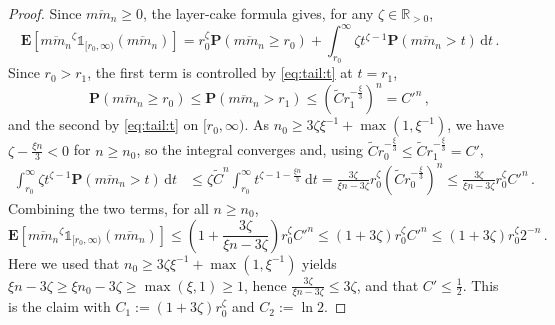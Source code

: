\documentclass{article}
\newcommand{\R}{\mathbb{R}}
\newcommand{\Rpp}{\R_{>0}}
\newcommand{\lab}{\left[} %
\newcommand{\rab}{\right]} %
\newcommand{\ab}[1]{\lab #1 \rab} %
\newcommand{\abOf}[1]{\!\ab{#1}} %
\newcommand{\lb}{\left(} %
\newcommand{\rb}{\right)} %
\newcommand{\br}[1]{\lb #1 \rb} %
\newcommand{\brOf}[1]{\!\br{#1}} %
\renewcommand{\Pr}{\mathbf{P}} %
\newcommand{\PrOf}[1]{\Pr\brOf{#1}}
\newcommand{\E}{\mathbf{E}} %
\newcommand{\EOf}[1]{\E\abOf{#1}}
\newcommand{\ind}{\mathds{1}}%
\newcommand{\indOfOf}[2]{\ind_{\!#1}\!\brOf{#2}}%
\newcommand{\eqcm}{\,,} %
\newcommand{\eqfs}{\,.}
\newcommand{\dl}{\mathrm{d}} %
\newcommand{\ol}[2]{\overline{#1#2}}
\begin{document}
\begin{proof}
    Since $\ol m{m_n} \geq 0$, the layer-cake formula gives, for any $\zeta \in \Rpp$,
    \begin{equation}
        \EOf{\ol m{m_n}^\zeta \indOfOf{[r_0,\infty)}{\ol m{m_n}}}
        =
        r_0^\zeta \PrOf{\ol m{m_n} \geq r_0}
        +
        \int_{r_0}^\infty \zeta t^{\zeta-1} \PrOf{\ol m{m_n} > t}\,\dl t
        \eqfs
    \end{equation}
    Since $r_0 > r_1$, the first term is controlled by \eqref{eq:tail:t} at $t = r_1$,
    \begin{equation}
        \PrOf{\ol m{m_n} \geq r_0}
        \leq
        \PrOf{\ol m{m_n} > r_1}
        \leq
        \br{\tilde C r_1^{-\frac\xi3}}^n
        =
        {C'}^n
        \eqcm
    \end{equation}
    and the second by \eqref{eq:tail:t} on $[r_0,\infty)$. As
    $n_0 \geq 3\zeta\xi^{-1} + \max(1,\xi^{-1})$, we have $\zeta - \frac{\xi n}3 < 0$
    for $n \geq n_0$, so the integral converges and, using
    $\tilde C r_0^{-\frac\xi3} \leq \tilde C r_1^{-\frac\xi3} = C'$,
    \begin{align}
        \int_{r_0}^\infty \zeta t^{\zeta-1} \PrOf{\ol m{m_n} > t}\,\dl t
        &\leq
        \zeta \tilde C^n \int_{r_0}^\infty t^{\zeta-1-\frac{\xi n}3}\,\dl t
        =
        \frac{3\zeta}{\xi n - 3\zeta} r_0^{\zeta} \br{\tilde C r_0^{-\frac\xi3}}^n
        \leq
        \frac{3\zeta}{\xi n - 3\zeta} r_0^\zeta {C'}^n
        \eqfs
    \end{align}
    Combining the two terms, for all $n \geq n_0$,
    \begin{equation}
        \EOf{\ol m{m_n}^\zeta \indOfOf{[r_0,\infty)}{\ol m{m_n}}}
        \leq
        \br{1 + \frac{3\zeta}{\xi n - 3\zeta}} r_0^\zeta {C'}^n
        \leq
        \br{1 + 3\zeta} r_0^\zeta {C'}^n
        \leq
        \br{1 + 3\zeta} r_0^\zeta 2^{-n}
        \eqfs
    \end{equation}
    Here we used that $n_0 \geq 3\zeta\xi^{-1} + \max(1,\xi^{-1})$ yields
    $\xi n - 3\zeta \geq \xi n_0 - 3\zeta \geq \max(\xi,1) \geq 1$, hence
    $\frac{3\zeta}{\xi n - 3\zeta} \leq 3\zeta$, and that $C' \leq \frac12$.
    This is the claim with $C_1 := (1+3\zeta) r_0^\zeta$ and $C_2 := \ln 2$.
\end{proof}
%
\end{document}
